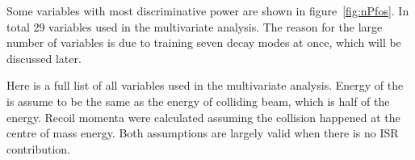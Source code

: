 Some variables with most discriminative power are shown in figure~\ref{fig:nPfos}. In total 29 variables used in the multivariate analysis. The reason for the large number of variables is due to training seven decay modes at once, which will be discussed later.

Here is a full list of all variables used in the multivariate analysis. Energy of the \Pgt is assume to be the same as the energy of \Pepm colliding beam, which is half of the \rootS energy. Recoil momenta were calculated assuming the \Pem\Pep collision happened at the centre of mass energy. Both assumptions are largely valid when there is no ISR contribution.

